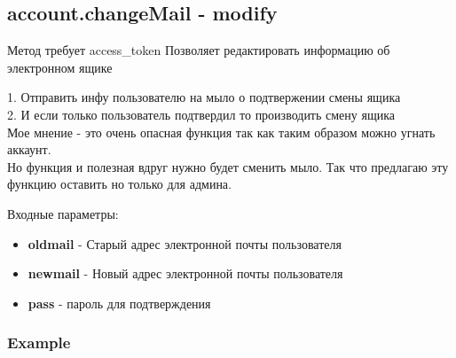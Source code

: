 \subsection{account.changeMail - modify}
Метод требует access\_token
Позволяет редактировать информацию об электронном ящике

1. Отправить инфу пользователю на мыло о подтвержении смены ящика \\
2. И если только пользователь подтвердил то производить смену ящика \\

Мое мнение - это очень опасная функция так как таким образом можно угнать аккаунт. \\
Но функция и полезная вдруг нужно будет сменить мыло. Так что предлагаю эту функцию оставить но только для админа.

Входные параметры:
\begin{itemize}
  \item \textbf{oldmail} - Старый адрес электронной почты пользователя
  \item \textbf{newmail} - Новый адрес электронной почты пользователя
  \item \textbf{pass} - пароль для подтверждения
\end{itemize}

\subsubsection{Example}
\begin{Verbatim}[frame=single]

\end{Verbatim}
